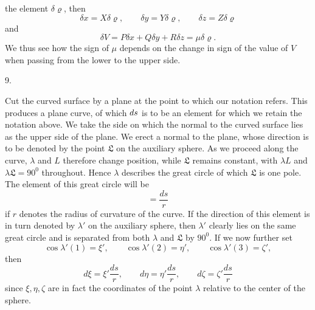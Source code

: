%
the element $\delta\varrho$, then
\[
\delta x=X\delta\varrho,\qquad\delta y=Y\delta\varrho,\qquad\delta z=Z\delta\varrho
\]
and
\[
\delta V=P\delta x+Q\delta y+R\delta z=\mu\delta\varrho.
\]
We thus see how the sign of $\mu$ depends on the change in sign of the value of $V$ when passing from the lower to the upper side.

\begin{center}9.\end{center}
\noindent\hspace*{1.2em}Cut the curved surface by a plane at the point to which our notation refers. This produces a plane curve, of which $ds\mathord{\hbox{}}$ is to be an element for which we retain the notation above. We take the side on which the normal to the curved surface lies as the upper side of the plane. We erect a normal to the plane, whose direction is to be denoted by the point $\mathfrak{L}$ on the auxiliary sphere. As we proceed along the curve, $\lambda$ and $L$ therefore change position, while $\mathfrak{L}$ remains constant, with $\lambda L$ and $\lambda\mathfrak{L}=90^{0}$ throughout. Hence $\lambda$ describes the great circle of which $\mathfrak{L}$ is one pole. The element of this great circle will be
\[
=\frac{ds}{r}
\]
if $r$ denotes the radius of curvature of the curve. If the direction of this element is in turn denoted by $\lambda'$ on the auxiliary sphere, then $\lambda'$ clearly lies on the same great circle and is separated from both $\lambda$ and $\mathfrak{L}$ by $90^{0}$. If we now further set
\[
\cos\lambda'(1)=\xi',\qquad\cos\lambda'(2)=\eta',\qquad\cos\lambda'(3)=\zeta',
\]
then
\[
d\xi=\xi'\frac{ds}{r},\qquad d\eta=\eta'\frac{ds}{r},\qquad d\zeta=\zeta'\frac{ds}{r}
\]
since $\xi,\eta,\zeta$ are in fact the coordinates of the point $\lambda$ relative to the center of the sphere.
